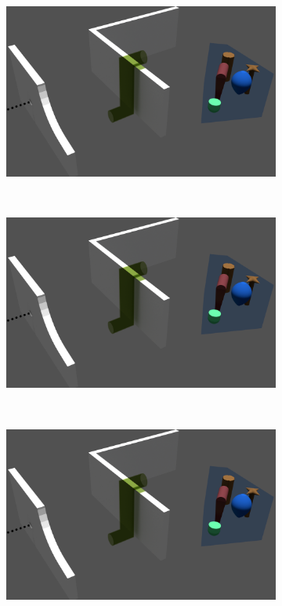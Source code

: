 \documentclass[12pt,a4]{article}
\begin{document}
\begin{figure}[ht!]
\begin{subfigure}{0.3\textwidth}
    \end{subfigure}%
\\
~\\
        \begin{subfigure}{0.3\textwidth}
        \centering
        \includegraphics[width=1\linewidth]{figures/figscene.png}

    \end{subfigure}%
		~   
       \begin{subfigure}{0.3\textwidth}
        \centering
        \includegraphics[width=1\linewidth]{figures/figscene.png}
           \end{subfigure}
               ~
        \begin{subfigure}{0.3\textwidth}
        \centering
        \includegraphics[width=1\linewidth]{figures/figscene.png}
       

\end{subfigure}
\end{figure}
\end{document}
